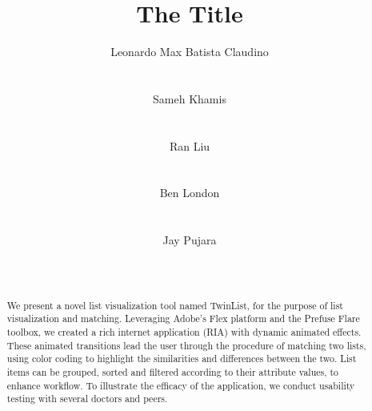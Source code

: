 \documentclass{chi2009}
\begin{document}
\setlength{\paperheight}{11in}
\setlength{\paperwidth}{8.5in}
\setlength{\pdfpageheight}{\paperheight}
\setlength{\pdfpagewidth}{\paperwidth}


\title{The Title}
\author{
  \alignauthor Leonardo Max Batista Claudino \\
    \\
    \\
  \alignauthor Sameh Khamis\\
    \\
    \\
  \alignauthor Ran Liu \\
    \\
    \\
  \alignauthor Ben London \\
    \\
    \\
  \alignauthor Jay Pujara \\
    \\
    \\
}

\maketitle

\begin{abstract}
We present a novel list visualization tool named TwinList, for the purpose of list visualization and matching. Leveraging Adobe's Flex platform and the Prefuse Flare toolbox, we created a rich internet application (RIA) with dynamic animated effects. These animated transitions lead the user through the procedure of matching two lists, using color coding to highlight the similarities and differences between the two. List items can be grouped, sorted and filtered according to their attribute values, to enhance workflow. To illustrate the efficacy of the application, we conduct usability testing with several doctors and peers.
\end{abstract}
\end{document}
